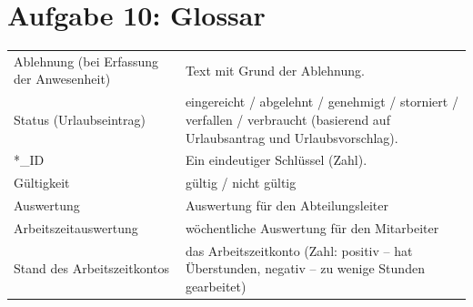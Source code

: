\chapter*{Aufgabe 10: Glossar}
\setcounter{section}{0}
\addtocounter{chapter}{1}

\begin{tabular}{L{0.3} L{0.7}}
Ablehnung (bei Erfassung der Anwesenheit)					&	Text mit Grund der Ablehnung.				\\
Status (Urlaubseintrag)					&	eingereicht / abgelehnt / genehmigt / storniert / verfallen / verbraucht (basierend auf Urlaubsantrag und Urlaubsvorschlag).				\\
*\_ID					&	Ein eindeutiger Schlüssel (Zahl).				\\
Gültigkeit					&	gültig / nicht gültig				\\
Auswertung					&	Auswertung für den Abteilungsleiter				\\
Arbeitszeitauswertung					&	wöchentliche Auswertung für den Mitarbeiter				\\
Stand des Arbeitszeitkontos					&	das Arbeitszeitkonto (Zahl: positiv -- hat Überstunden, negativ -- zu wenige Stunden gearbeitet)				\\
\end{tabular}

 
